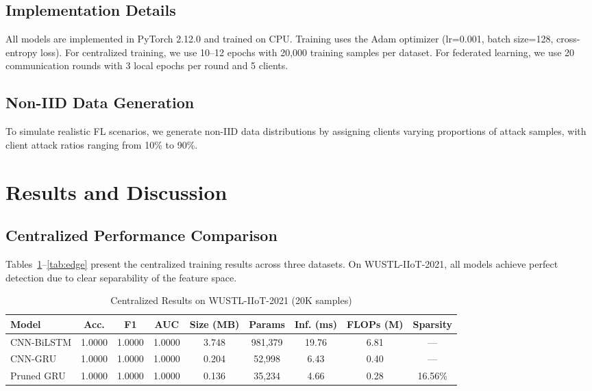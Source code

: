 \documentclass[a4paper,fleqn]{cas-sc}
\begin{document}
\subsection{Implementation Details}
\label{sec:implementation}

All models are implemented in PyTorch 2.12.0 and trained on CPU. Training uses the Adam optimizer (lr=0.001, batch size=128, cross-entropy loss). For centralized training, we use 10--12 epochs with 20,000 training samples per dataset. For federated learning, we use 20 communication rounds with 3 local epochs per round and 5 clients.

\subsection{Non-IID Data Generation}
\label{sec:non-iid}

To simulate realistic FL scenarios, we generate non-IID data distributions by assigning clients varying proportions of attack samples, with client attack ratios ranging from 10\% to 90\%.

\section{Results and Discussion}
\label{sec:results}

\subsection{Centralized Performance Comparison}
\label{sec:centralized}

Tables~\ref{tab:wustl}--\ref{tab:edge} present the centralized training results across three datasets. On WUSTL-IIoT-2021, all models achieve perfect detection due to clear separability of the feature space.

\begin{table}[t]
\centering
\caption{Centralized Results on WUSTL-IIoT-2021 (20K samples)}
\label{tab:wustl}
\begin{tabular}{lcccccccc}
\toprule
Model & Acc. & F1 & AUC & Size (MB) & Params & Inf. (ms) & FLOPs (M) & Sparsity \\
\midrule
CNN-BiLSTM & 1.0000 & 1.0000 & 1.0000 & 3.748 & 981,379 & 19.76 & 6.81 & --- \\
CNN-GRU & 1.0000 & 1.0000 & 1.0000 & 0.204 & 52,998 & 6.43 & 0.40 & --- \\
Pruned GRU & 1.0000 & 1.0000 & 1.0000 & 0.136 & 35,234 & 4.66 & 0.28 & 16.56\% \\
\bottomrule
\end{tabular}
\end{table}
\end{document}
